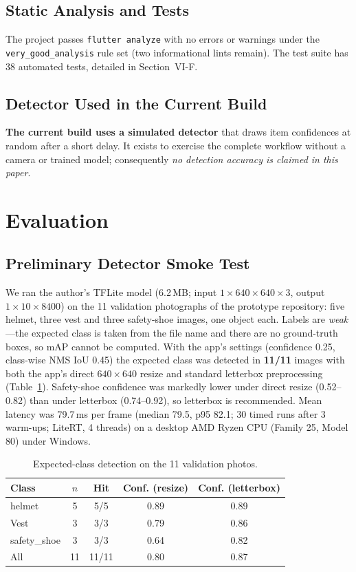 \documentclass[conference]{IEEEtran}
\begin{document}
\subsection{Static Analysis and Tests}
The project passes \texttt{flutter analyze} with no errors or warnings under
the \texttt{very\_good\_analysis} rule set (two informational lints remain).
The test suite has 38 automated tests, detailed in Section~VI-F.
\subsection{Detector Used in the Current Build}
\textbf{The current build uses a simulated detector} that draws item
confidences at random after a short delay. It exists to exercise the complete
workflow without a camera or trained model; consequently \emph{no detection
accuracy is claimed in this paper}.

\section{Evaluation}
\subsection{Preliminary Detector Smoke Test}
We ran the author's TFLite model (6.2\,MB; input $1{\times}640{\times}640{\times}3$,
output $1{\times}10{\times}8400$) on the 11 validation photographs of the
prototype repository: five helmet, three vest and three safety-shoe images, one
object each. Labels are \emph{weak}---the expected class is taken from the file
name and there are no ground-truth boxes, so mAP cannot be computed. With the
app's settings (confidence 0.25, class-wise NMS IoU 0.45) the expected class was
detected in \textbf{11/11} images with both the app's direct $640{\times}640$
resize and standard letterbox preprocessing (Table~\ref{tab:smoke}). Safety-shoe
confidence was markedly lower under direct resize (0.52--0.82) than under
letterbox (0.74--0.92), so letterbox is recommended. Mean latency was 79.7\,ms per
frame (median 79.5, p95 82.1; 30 timed runs after 3 warm-ups; LiteRT, 4 threads)
on a desktop AMD Ryzen CPU (Family 25, Model 80) under Windows.

\begin{table}[t]
\caption{Expected-class detection on the 11 validation photos.}
\label{tab:smoke}
\centering
\begin{tabular}{lcccc}
\toprule
Class & $n$ & Hit & Conf. (resize) & Conf. (letterbox)\\
\midrule
helmet      & 5  & 5/5   & 0.89 & 0.89\\
Vest        & 3  & 3/3   & 0.79 & 0.86\\
safety\_shoe & 3 & 3/3   & 0.64 & 0.82\\
\midrule
All         & 11 & 11/11 & 0.80 & 0.87\\
\bottomrule
\end{tabular}
\end{table}
\end{document}
